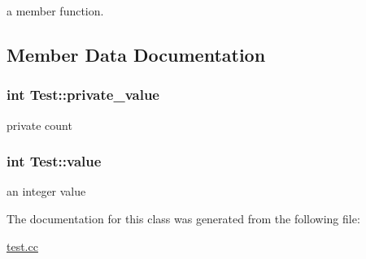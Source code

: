 a member function. 



\subsection{Member Data Documentation}
\hypertarget{classTest_a54d452cda3663a038c91b7dd04188be7}{}
\subsubsection[{private\+\_\+value}]{\setlength{\rightskip}{0pt plus 5cm}int Test\+::private\+\_\+value\hspace{0.3cm}{\ttfamily [private]}}\label{classTest_a54d452cda3663a038c91b7dd04188be7}
private count \hypertarget{classTest_ad55002283eba8ffa062dfb849f6c077c}{}
\subsubsection[{value}]{\setlength{\rightskip}{0pt plus 5cm}int Test\+::value\hspace{0.3cm}{\ttfamily [protected]}}\label{classTest_ad55002283eba8ffa062dfb849f6c077c}
an integer value 

The documentation for this class was generated from the following file\+:\begin{DoxyCompactItemize}
\item 
\hyperlink{test_8cc}{test.\+cc}\end{DoxyCompactItemize}
